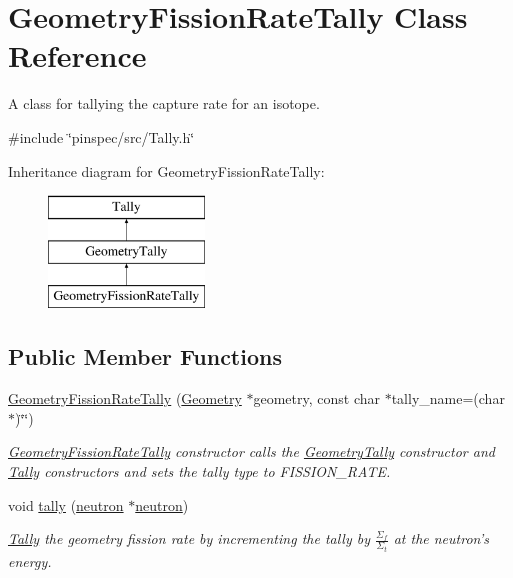 \hypertarget{classGeometryFissionRateTally}{\section{Geometry\-Fission\-Rate\-Tally Class Reference}
\label{classGeometryFissionRateTally}
}


A class for tallying the capture rate for an isotope.  




{\ttfamily \#include \char`\"{}pinspec/src/\-Tally.\-h\char`\"{}}

Inheritance diagram for Geometry\-Fission\-Rate\-Tally\-:\begin{figure}[H]
\begin{center}
\leavevmode
\includegraphics[height=3.000000cm]{classGeometryFissionRateTally}
\end{center}
\end{figure}
\subsection*{Public Member Functions}
\begin{DoxyCompactItemize}
\item 
\hyperlink{classGeometryFissionRateTally_a041d7971d78dd0c45287242720e33d32}{Geometry\-Fission\-Rate\-Tally} (\hyperlink{classGeometry}{Geometry} $\ast$geometry, const char $\ast$tally\-\_\-name=(char $\ast$)\char`\"{}\char`\"{})
\begin{DoxyCompactList}\small\item\em \hyperlink{classGeometryFissionRateTally}{Geometry\-Fission\-Rate\-Tally} constructor calls the \hyperlink{classGeometryTally}{Geometry\-Tally} constructor and \hyperlink{classTally}{Tally} constructors and sets the tally type to F\-I\-S\-S\-I\-O\-N\-\_\-\-R\-A\-T\-E. \end{DoxyCompactList}\item 
void \hyperlink{classGeometryFissionRateTally_aabf84c492a081ac3fb86993be3896a62}{tally} (\hyperlink{structneutron}{neutron} $\ast$\hyperlink{structneutron}{neutron})
\begin{DoxyCompactList}\small\item\em \hyperlink{classTally}{Tally} the geometry fission rate by incrementing the tally by $ \frac{\Sigma_f}{\Sigma_t} $ at the neutron's energy. \end{DoxyCompactList}\end{DoxyCompactItemize}
